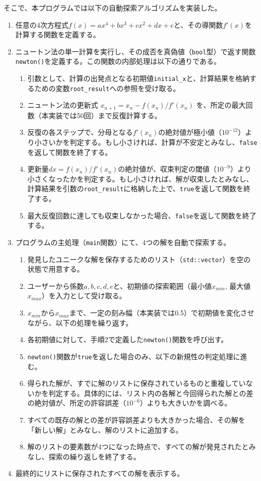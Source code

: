 \documentclass[dvipdfmx,a4paper]{jsarticle}
\newcommand{\code}[1]{\colorbox{inlinebackcolour}{\lstinline|#1|}}
\begin{document}
そこで、本プログラムでは以下の自動探索アルゴリズムを実装した。
\begin{enumerate}
    \item 任意の4次方程式$f(x)=ax^4+bx^3+cx^2+dx+e$と、その導関数$f'(x)$を計算する関数を定義する。

    \item ニュートン法の単一計算を実行し、その成否を真偽値（\code{bool}型）で返す関数\code{newton()}を定義する。この関数の内部処理は以下の通りである。
    \begin{enumerate}
        \item 引数として、計算の出発点となる初期値\code{initial_x}と、計算結果を格納するための変数\code{root_result}への参照を受け取る。
        \item ニュートン法の更新式 $x_{n+1} = x_n - f(x_n)/f'(x_n)$ を、所定の最大回数（本実装では50回）まで反復計算する。
        \item 反復の各ステップで、分母となる$f'(x_n)$の絶対値が極小値（$10^{-12}$）より小さいかを判定する。もし小さければ、計算が不安定とみなし、\code{false}を返して関数を終了する。
        \item 更新量$dx = f(x_n)/f'(x_n)$の絶対値が、収束判定の閾値（$10^{-9}$）より小さくなったかを判定する。もし小さければ、解が収束したとみなし、計算結果を引数の\code{root_result}に格納した上で、\code{true}を返して関数を終了する。
        \item 最大反復回数に達しても収束しなかった場合、\code{false}を返して関数を終了する。
    \end{enumerate}

    \item プログラムの主処理（\code{main}関数）にて、4つの解を自動で探索する。
    \begin{enumerate}
        \item 発見したユニークな解を保存するためのリスト（\code{std::vector}）を空の状態で用意する。
        \item ユーザーから係数$a, b, c, d, e$と、初期値の探索範囲（最小値$x_{min}$, 最大値$x_{max}$）を入力として受け取る。
        \item $x_{min}$から$x_{max}$まで、一定の刻み幅（本実装では0.5）で初期値を変化させながら、以下の処理を繰り返す。
        \item 各初期値に対して、手順2で定義した\code{newton()}関数を呼び出す。
        \item \code{newton()}関数が\code{true}を返した場合のみ、以下の新規性の判定処理に進む。
        \item 得られた解が、すでに解のリストに保存されているものと重複していないかを判定する。具体的には、リスト内の各解と今回得られた解との差の絶対値が、所定の許容誤差（$10^{-6}$）よりも大きいかを調べる。
        \item すべての既存の解との差が許容誤差よりも大きかった場合、その解を「新しい解」とみなし、解のリストに追加する。
        \item 解のリストの要素数が4つになった時点で、すべての解が発見されたとみなし、探索の繰り返しを終了する。
    \end{enumerate}
    
    \item 最終的にリストに保存されたすべての解を表示する。
\end{enumerate}
\end{document}
